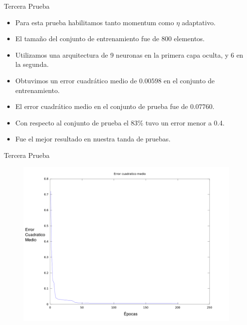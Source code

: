 \documentclass{beamer}
\begin{document}
\begin{frame}{Tercera Prueba}
\begin{itemize}
\item Para esta prueba habilitamos tanto momentum como $\eta$ adaptativo.
\item El tamaño del conjunto de entrenamiento fue de 800 elementos.
\item Utilizamos una arquitectura de 9 neuronas en la primera capa oculta, y 6 en la segunda.
\item Obtuvimos un error cuadrático medio de $0.00598$ en el conjunto de entrenamiento. 
\item El error cuadrático medio en el conjunto de prueba fue de $0.07760$.
\item Con respecto al conjunto de prueba el $83$\% tuvo un error menor a 0.4.
\item Fue el mejor resultado en nuestra tanda de pruebas.
\end{itemize}
\end{frame}
\begin{frame}{Tercera Prueba}
\begin{figure}[H]
\begin{center}
\includegraphics[scale=0.20]{images/t2-14/ecm.png}
\label{modelado}
\end{center}
\end{figure}
\end{frame}
\end{document}
